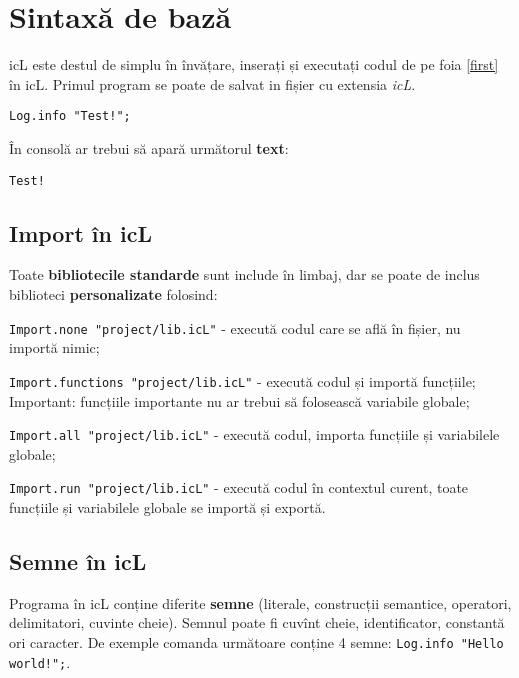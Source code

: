 \section{Sintaxă de bază}

icL este destul de simplu în învățare, inserați și executați codul de pe foia \ref{first} în icL. Primul program se poate de salvat in fișier cu extensia \textit{icL}.

\begin{lstlisting}[caption=Prima programă, label=first]
Log.info "Test!";
\end{lstlisting}

În consolă ar trebui să apară următorul \textbf{text}:

\begin{lstlisting}[numbers=none]
Test!
\end{lstlisting}

\subsection{Import în icL}

Toate \textbf{bibliotecile standarde} sunt include în limbaj, dar se poate de inclus biblioteci \textbf{personalizate} folosind:

\begin{icItems}
\item
	\lstinline|Import.none "project/lib.icL"| - execută codul care se află în fișier, nu importă nimic;
\item
	\lstinline|Import.functions "project/lib.icL"| - execută codul și importă funcțiile; {\color{red}Important:} funcțiile importante nu ar trebui să folosească variabile globale;
\item
	\lstinline|Import.all "project/lib.icL"| -  execută codul, importa funcțiile și variabilele globale;
\item
	\lstinline|Import.run "project/lib.icL"| - execută codul în contextul curent, toate funcțiile și variabilele globale se importă și exportă.
\end{icItems}

\subsection{Semne în icL}

Programa în icL conține diferite \textbf{semne} (literale, construcții semantice, operatori, delimitatori, cuvinte cheie). Semnul poate fi cuvînt cheie, identificator, constantă ori caracter. De exemple comanda următoare conține 4 semne: \lstinline|Log.info "Hello world!";|.

